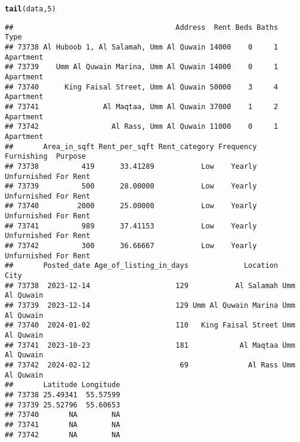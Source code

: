 \documentclass{article}\usepackage[]{graphicx}\usepackage[]{xcolor}
\makeatletter
\newcommand{\hlnum}[1]{\textcolor[rgb]{0.686,0.059,0.569}{#1}}%
\newcommand{\hlstd}[1]{\textcolor[rgb]{0.345,0.345,0.345}{#1}}%
\newcommand{\hlkwd}[1]{\textcolor[rgb]{0.737,0.353,0.396}{\textbf{#1}}}%
\newenvironment{kframe}{%
 \def\at@end@of@kframe{}%
 \ifinner\ifhmode%
  \def\at@end@of@kframe{\end{minipage}}%
  \begin{minipage}{\columnwidth}%
 \fi\fi%
 \def\FrameCommand##1{\hskip\@totalleftmargin \hskip-\fboxsep
 \colorbox{shadecolor}{##1}\hskip-\fboxsep
     \hskip-\linewidth \hskip-\@totalleftmargin \hskip\columnwidth}%
 \MakeFramed {\advance\hsize-\width
   \@totalleftmargin\z@ \linewidth\hsize
   \@setminipage}}%
 {\par\unskip\endMakeFramed%
 \at@end@of@kframe}
\newenvironment{knitrout}{}{} %
\makeatother
\begin{document}
\begin{knitrout}
\color{fgcolor}\begin{kframe}
\begin{alltt}
\hlkwd{tail}\hlstd{(data,} \hlnum{5}\hlstd{)}
\end{alltt}
\begin{verbatim}
##                                      Address  Rent Beds Baths      Type
## 73738 Al Huboob 1, Al Salamah, Umm Al Quwain 14000    0     1 Apartment
## 73739    Umm Al Quwain Marina, Umm Al Quwain 14000    0     1 Apartment
## 73740      King Faisal Street, Umm Al Quwain 50000    3     4 Apartment
## 73741               Al Maqtaa, Umm Al Quwain 37000    1     2 Apartment
## 73742                 Al Rass, Umm Al Quwain 11000    0     1 Apartment
##       Area_in_sqft Rent_per_sqft Rent_category Frequency  Furnishing  Purpose
## 73738          419      33.41289           Low    Yearly Unfurnished For Rent
## 73739          500      28.00000           Low    Yearly Unfurnished For Rent
## 73740         2000      25.00000           Low    Yearly Unfurnished For Rent
## 73741          989      37.41153           Low    Yearly Unfurnished For Rent
## 73742          300      36.66667           Low    Yearly Unfurnished For Rent
##       Posted_date Age_of_listing_in_days             Location          City
## 73738  2023-12-14                    129           Al Salamah Umm Al Quwain
## 73739  2023-12-14                    129 Umm Al Quwain Marina Umm Al Quwain
## 73740  2024-01-02                    110   King Faisal Street Umm Al Quwain
## 73741  2023-10-23                    181            Al Maqtaa Umm Al Quwain
## 73742  2024-02-12                     69              Al Rass Umm Al Quwain
##       Latitude Longitude
## 73738 25.49341  55.57599
## 73739 25.52796  55.60653
## 73740       NA        NA
## 73741       NA        NA
## 73742       NA        NA
\end{verbatim}
\end{kframe}
\end{knitrout}
\end{document}
